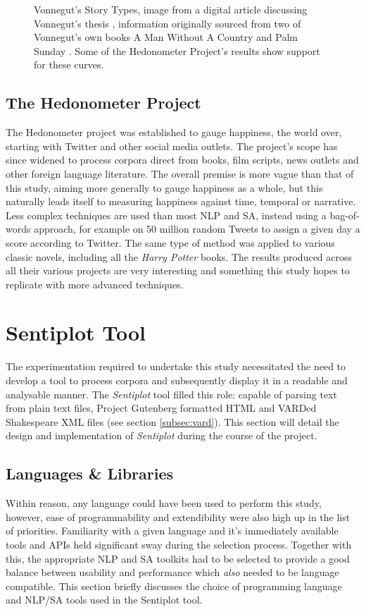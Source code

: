 \documentclass{article}
\begin{document}
{\begin{figure}[htbp]
            \caption{Vonnegut's Story Types, image from a digital article discussing Vonnegut's thesis \citep{vonnegutThesis}, information originally sourced from two of Vonnegut's own books \textup{A Man Without A Country} \citep{vonnegut_simon_2007} and \textup{Palm Sunday} \citep{vonnegut_1981}. Some of the Hedonometer Project's results show support for these curves.}
            \label{fig:storyTypes}
        \end{figure}
        
    \subsection{The Hedonometer Project}
    \label{subsec:hedonometer}
        The Hedonometer project was established to gauge happiness, the world over, starting with Twitter and other social media outlets. The project’s scope has since widened to process corpora direct from books, film scripts, news outlets and other foreign language literature. The overall premise is more vague than that of this study, aiming more generally to gauge happiness as a whole, but this naturally leads itself to measuring happiness against time, temporal or narrative. 
        Less complex techniques are used than most NLP and SA, instead using a bag-of-words approach, for example on 50 million random Tweets to assign a given day a score according to Twitter. The same type of method was applied to various classic novels, including all the \textit{Harry Potter} books. The results produced across all their various projects are very interesting and something this study hopes to replicate with more advanced techniques.
\newpage
\section{Sentiplot Tool}
\label{sec:sentiplot}
The experimentation required to undertake this study necessitated the need to develop a tool to process corpora and subsequently display it in a readable and analysable manner. The \textit{Sentiplot} tool filled this role: capable of parsing text from plain text files, Project Gutenberg formatted HTML and VARDed Shakespeare XML files (see section \ref{subsec:vard}). This section will detail the design and implementation of \textit{Sentiplot} during the course of the project. 
    \subsection{Languages \& Libraries}
    Within reason, any language could have been used to perform this study, however, ease of programmability and extendibility were also high up in the list of priorities. Familiarity with a given language and it's immediately available tools and APIs held significant sway during the selection process. Together with this, the appropriate NLP and SA toolkits had to be selected to provide a good balance between usability and performance which \textit{also} needed to be language compatible. This section briefly discusses the choice of programming language and NLP/SA tools used in the Sentiplot tool.
}
\end{document}
